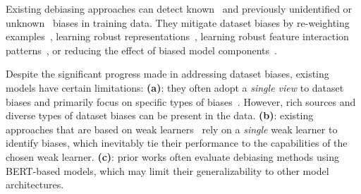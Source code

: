 Existing debiasing approaches %
can detect known~\citep{clark-etal-2019-dont,sanh2020learning,karimi-mahabadi-etal-2020-end,modarressi-etal-2023-guide} and previously unidentified or unknown~\citep{utama-etal-2020-towards,sanh2020learning} biases in training data.
They mitigate dataset biases by 
re-weighting examples~\citep{sanh2020learning,karimi-mahabadi-etal-2020-end}, 
learning robust representations~\citep{gao-etal-2022-kernel,du-etal-2023-towards}, 
learning robust feature interaction patterns~\citep{wang-etal-2023-robust}, or 
reducing the effect of biased model components~\citep{meissner-etal-2022-debiasing}.


Despite the significant progress made in addressing dataset biases, existing models have certain limitations:
\textbf{(a)}: they often adopt a {\em single view} to dataset biases and primarily focus on specific types of biases~\citep{clark-etal-2019-dont,karimi-mahabadi-etal-2020-end}. However, rich sources and diverse types of dataset biases can be present in the data.
\textbf{(b)}: existing approaches that are based on weak learners~\citep{utama-etal-2020-towards,sanh2020learning,ghaddar-etal-2021-end,meissner-etal-2022-debiasing} rely on a {\em single} weak learner to identify biases, which inevitably tie their performance to the capabilities of the chosen weak learner.
\textbf{(c)}: prior works often evaluate debiasing methods using BERT-based models, which may limit their generalizability to other model architectures. 


